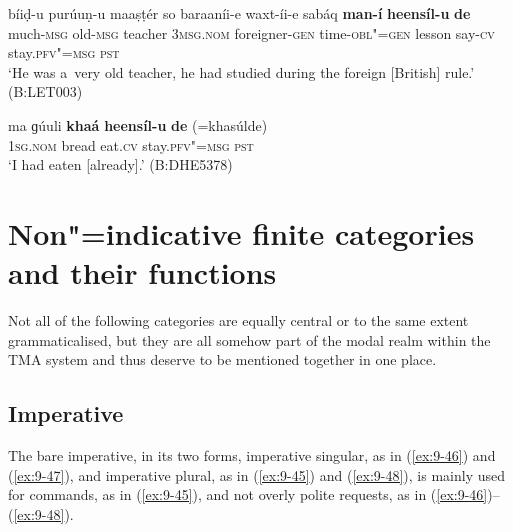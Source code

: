 \begin{exe}
\ex
\label{ex:9-43}
\gll bíiḍ-u purúuṇ-u maaṣṭér so baraaníi-e waxt-íi-e sabáq \textbf{man-í} \textbf{heensíl-u} \textbf{de} \\
much-\textsc{msg} old-\textsc{msg} teacher 3\textsc{msg.nom}  foreigner-\textsc{gen}
time-\textsc{obl"=gen} lesson say-\textsc{cv} stay.\textsc{pfv"=msg} \textsc{pst} \\
\glt `He was a~very old teacher, he had studied during the foreign [British] rule.' (B:LET003)

\ex
\label{ex:9-44}
\gll ma ɡúuli \textbf{khaá} \textbf{heensíl-u} \textbf{de} (=khasúlde) \\
\textsc{1sg.nom} bread eat.\textsc{cv} stay.\textsc{pfv"=msg} \textsc{pst}  \\
\glt `I had eaten [already].' (B:DHE5378)
\end{exe}

\section{Non"=indicative finite categories and their functions}
\label{sec:9-2}


Not all of the following categories are equally central or to the same extent grammaticalised, but they are all somehow part of the modal realm within the TMA system and thus deserve to be mentioned together in one place.


\subsection{Imperative}
\label{subsec:9-2-1}

The bare imperative, in its two forms, imperative singular, as in (\ref{ex:9-46}) and (\ref{ex:9-47}), and imperative plural, as in (\ref{ex:9-45}) and (\ref{ex:9-48}), is mainly used for commands, as in (\ref{ex:9-45}), and not overly polite requests, as in (\ref{ex:9-46})--(\ref{ex:9-48}).


